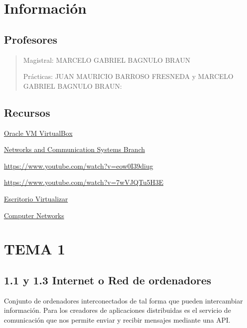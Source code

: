\documentclass[12pt, twoside, openright]{report} %
\begin{document}
\listoffigures
\thispagestyle{fancy}





\chapter{Información}
\section{Profesores}
\begin{quote}
	Magistral: MARCELO GABRIEL BAGNULO BRAUN

	Prácticas: JUAN MAURICIO BARROSO FRESNEDA y MARCELO GABRIEL BAGNULO BRAUN:
\end{quote}

\section{Recursos}

\href{https://www.virtualbox.org/}{Oracle VM VirtualBox}

\href{https://www.nrl.navy.mil/itd/ncs/products/core}{Networks and
	Communication Systems Branch}

\url{https://www.youtube.com/watch?v=eow0I39diug}

\url{https://www.youtube.com/watch?v=7wVJQTu5H3E}

\href{http://www.ingebook.com/ib/NPcd/IB_Escritorio_Visualizar?cod_primaria=1000193\&libro=6752}{Escritorio Virtualizar}

\href{https://padlet.com/fvalera/8njxmoxyj4qgck6d}{Computer Networks}


\chapter{TEMA 1}

\section{1.1 y 1.3 Internet o Red de ordenadores}

Conjunto de ordenadores interconectados de tal forma que pueden
intercambiar información. Para los creadores de aplicaciones
distribuidas es el servicio de comunicación que nos permite enviar y
recibir mensajes mediante una API.
\end{document}
